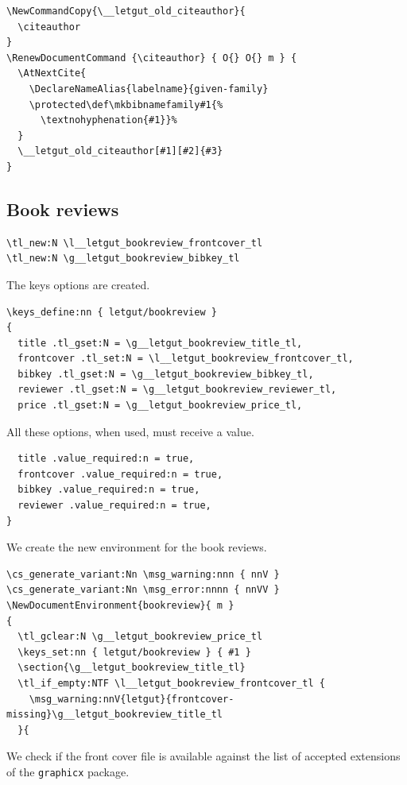 \documentclass{letgut}
\begin{document}
\begin{lstlisting}
\NewCommandCopy{\__letgut_old_citeauthor}{
  \citeauthor
}
\RenewDocumentCommand {\citeauthor} { O{} O{} m } {
  \AtNextCite{
    \DeclareNameAlias{labelname}{given-family}
    \protected\def\mkbibnamefamily#1{%
      \textnohyphenation{#1}}%
  }
  \__letgut_old_citeauthor[#1][#2]{#3}
}
\end{lstlisting}
\subsection{Book reviews}
\label{ImplementationBookreviews-ekzg55h0jlj0}
\begin{lstlisting}
\tl_new:N \l__letgut_bookreview_frontcover_tl
\tl_new:N \g__letgut_bookreview_bibkey_tl
\end{lstlisting}
The keys options are created.
\begin{lstlisting}
\keys_define:nn { letgut/bookreview }
{
  title .tl_gset:N = \g__letgut_bookreview_title_tl,
  frontcover .tl_set:N = \l__letgut_bookreview_frontcover_tl,
  bibkey .tl_gset:N = \g__letgut_bookreview_bibkey_tl,
  reviewer .tl_gset:N = \g__letgut_bookreview_reviewer_tl,
  price .tl_gset:N = \g__letgut_bookreview_price_tl,
\end{lstlisting}

All these options, when used, must receive a value.

\begin{lstlisting}
  title .value_required:n = true,
  frontcover .value_required:n = true,
  bibkey .value_required:n = true,
  reviewer .value_required:n = true,
}
\end{lstlisting}

We create the new environment for the book reviews.

\begin{lstlisting}
\cs_generate_variant:Nn \msg_warning:nnn { nnV }
\cs_generate_variant:Nn \msg_error:nnnn { nnVV }
\NewDocumentEnvironment{bookreview}{ m }
{
  \tl_gclear:N \g__letgut_bookreview_price_tl
  \keys_set:nn { letgut/bookreview } { #1 }
  \section{\g__letgut_bookreview_title_tl}
  \tl_if_empty:NTF \l__letgut_bookreview_frontcover_tl {
    \msg_warning:nnV{letgut}{frontcover-missing}\g__letgut_bookreview_title_tl
  }{
\end{lstlisting}

We check if the front cover file is available against the list of accepted
extensions of the \lstinline+graphicx+ package.
\end{document}

